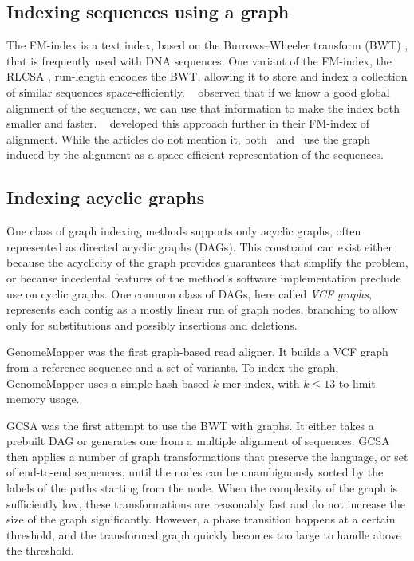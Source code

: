 \subsection{Indexing sequences using a graph}

The FM-index \cite{Ferragina_2005} is a text index, based on the Burrows--Wheeler transform (BWT) \cite{Burrows_1994}, that is frequently used with DNA sequences.
One variant of the FM-index, the RLCSA \cite{Maekinen_2010}, run-length encodes the BWT, allowing it to store and index a collection of similar sequences space-efficiently.
\citeauthor{Huang_2010}\ \cite{Huang_2010} observed that if we know a good global alignment of the sequences, we can use that information to make the index both smaller and faster.
\citeauthor{Na_2016}\ \cite{Na_2016,Na_2018} developed this approach further in their FM-index of alignment.
While the articles do not mention it, both \citeauthor{Huang_2010}\ and \citeauthor{Na_2016}\ use the graph induced by the alignment as a space-efficient representation of the sequences.

\subsection{Indexing acyclic graphs}

One class of graph indexing methods supports only acyclic graphs, often represented as directed acyclic graphs (DAGs).
This constraint can exist either because the acyclicity of the graph provides guarantees that simplify the problem, or because incedental features of the method's software implementation preclude use on cyclic graphs.
One common class of DAGs, here called \emph{VCF graphs}, represents each contig as a mostly linear run of graph nodes, branching to allow only for substitutions and possibly insertions and deletions.

GenomeMapper \cite{Schneeberger_2009} was the first graph-based read aligner.
It builds a VCF graph from a reference sequence and a set of variants.
To index the graph, GenomeMapper uses a simple hash-based $k$-mer index, with $k \le 13$ to limit memory usage.

GCSA \cite{Siren_2014} was the first attempt to use the BWT with graphs.
It either takes a prebuilt DAG or generates one from a multiple alignment of sequences.
GCSA then applies a number of graph transformations that preserve the language, or set of end-to-end sequences, until the nodes can be unambiguously sorted by the labels of the paths starting from the node.
When the complexity of the graph is sufficiently low, these transformations are reasonably fast and do not increase the size of the graph significantly.
However, a phase transition happens at a certain threshold, and the transformed graph quickly becomes too large to handle above the threshold.

